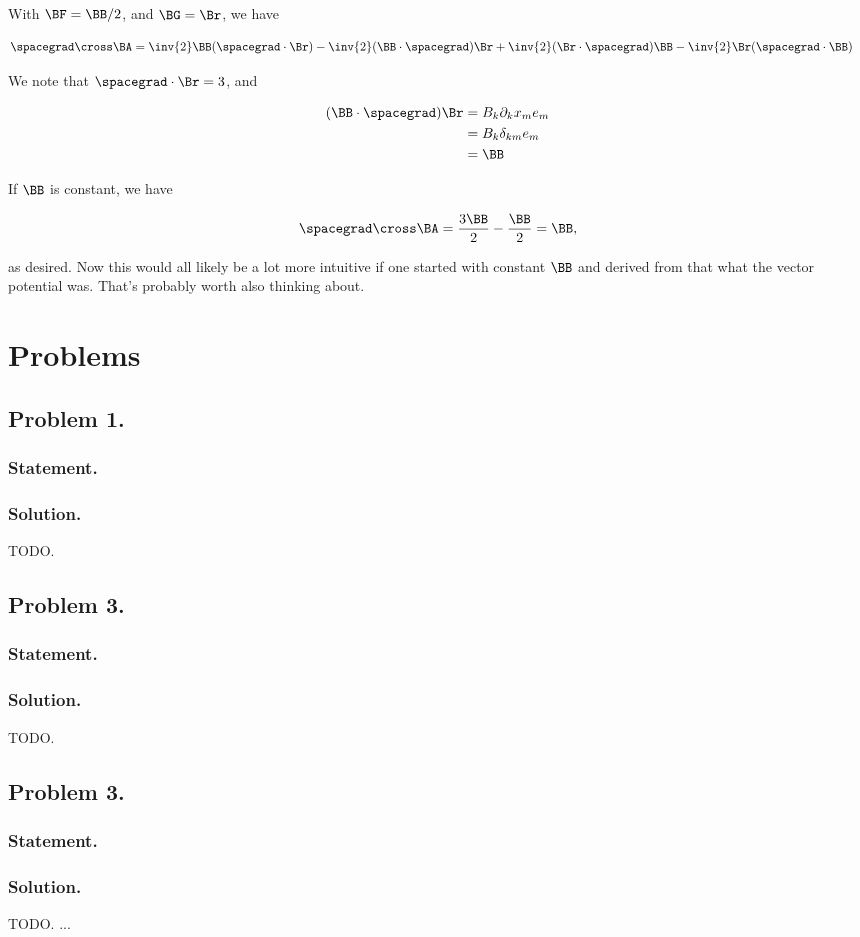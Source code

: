 With $\BF = \BB/2$, and $\BG = \Br$, we have

\begin{align*}
\spacegrad \cross \BA
&=
\inv{2}
\BB (\spacegrad \cdot \Br) -\inv{2}(\BB \cdot \spacegrad) \Br
+\inv{2}(\Br \cdot \spacegrad ) \BB  -\inv{2}\Br (\spacegrad \cdot \BB)
\end{align*}

We note that $\spacegrad \cdot \Br = 3$, and 

\begin{align*}
(\BB \cdot \spacegrad ) \Br 
&=
B_k \partial_k x_m e_m \\
&=
B_k \delta_{km} e_m \\
&=
\BB
\end{align*}

If $\BB$ is constant, we have

\begin{align}\label{eqn:desaiCh6:7}
\spacegrad \cross \BA = \frac{3\BB}{2} - \frac{\BB}{2} = \BB,
\end{align}

as desired.  Now this would all likely be a lot more intuitive if one started with constant $\BB$ and derived from that what the vector potential was.  That's probably worth also thinking about.

\section{Problems}

\subsection{Problem 1.}
\subsubsection{Statement.}
\subsubsection{Solution.}

TODO.

\subsection{Problem 3.}
\subsubsection{Statement.}
\subsubsection{Solution.}

TODO.

\subsection{Problem 3.}
\subsubsection{Statement.}
\subsubsection{Solution.}

TODO.
...

\EndArticle

